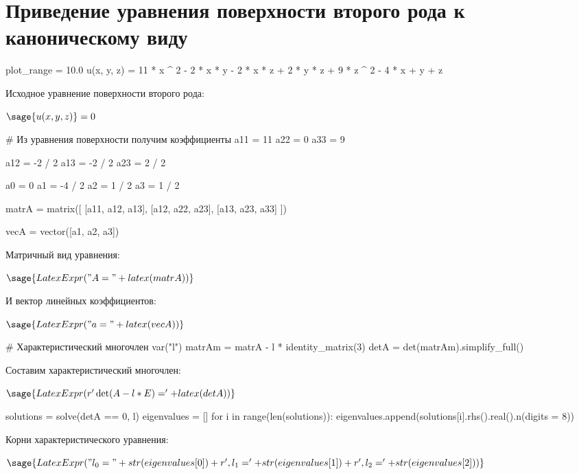 \section{Приведение уравнения поверхности второго рода к каноническому виду}

\begin{sagesilent}
    plot_range = 10.0
    u(x, y, z) = 11 * x ^ 2 - 2 * x * y - 2 * x * z + 2 * y * z + 9 * z ^ 2 - 4 * x + y + z
\end{sagesilent}

Исходное уравнение поверхности второго рода:

$\sage{u(x, y, z)} = 0$

\begin{sagesilent}
    # Из уравнения поверхности получим коэффициенты
    a11 = 11
    a22 = 0
    a33 = 9

    a12 = -2 / 2
    a13 = -2 / 2
    a23 = 2 / 2

    a0 = 0
    a1 = -4 / 2
    a2 = 1 / 2
    a3 = 1 / 2

    matrA = matrix([
    [a11, a12, a13],
    [a12, a22, a23],
    [a13, a23, a33]
    ])

    vecA = vector([a1, a2, a3])
\end{sagesilent}

Матричный вид уравнения:

$\sage{LatexExpr("A = " + latex(matrA))}$

И вектор линейных коэффициентов:

$\sage{LatexExpr("a = " + latex(vecA))}$

\begin{sagesilent}
    # Характеристический многочлен
    var("l")
    matrAm = matrA - l * identity_matrix(3)
    detA = det(matrAm).simplify_full()
\end{sagesilent}

Составим характеристический многочлен:

$\sage{LatexExpr(r'\det(A - l * E) = ' + latex(detA))}$

\begin{sagesilent}
    solutions = solve(detA == 0, l)
    eigenvalues = []
    for i in range(len(solutions)):
        eigenvalues.append(solutions[i].rhs().real().n(digits = 8))
\end{sagesilent}

Корни характеристического уравнения:

$\sage{LatexExpr("l_0 = " + str(eigenvalues[0]) + r', l_1 = ' + str(eigenvalues[1]) + r', l_2 = ' + str(eigenvalues[2]))}$

